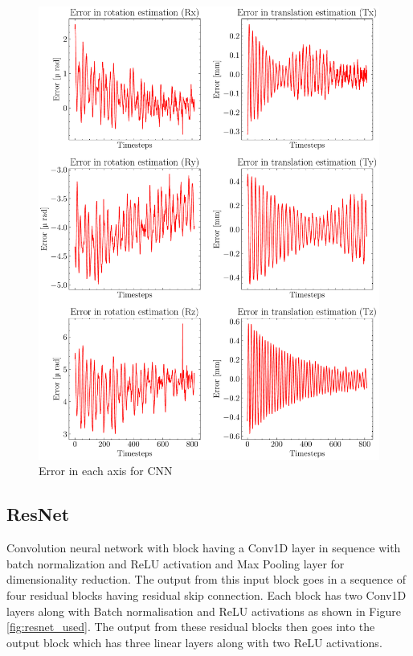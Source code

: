 \begin{figure}[H]
    \centering
    \includegraphics[scale=0.65]{images/fig_chapter4/nn_related/error_in_predicted_vs_ground_truth_cnn.pdf}
    \caption{Error in each axis for CNN}
    \label{fig:cnn_error}
\end{figure}

\subsection{ResNet}
Convolution neural network with block having a Conv1D layer in sequence with batch normalization and ReLU activation and Max Pooling layer for dimensionality reduction. The output from this input block goes in a sequence of four residual blocks having residual skip connection. Each block has two Conv1D layers along with Batch normalisation and ReLU activations as shown in Figure \ref{fig:resnet_used}. The output from these residual blocks then goes into the output block which has three linear layers along with two ReLU activations.


